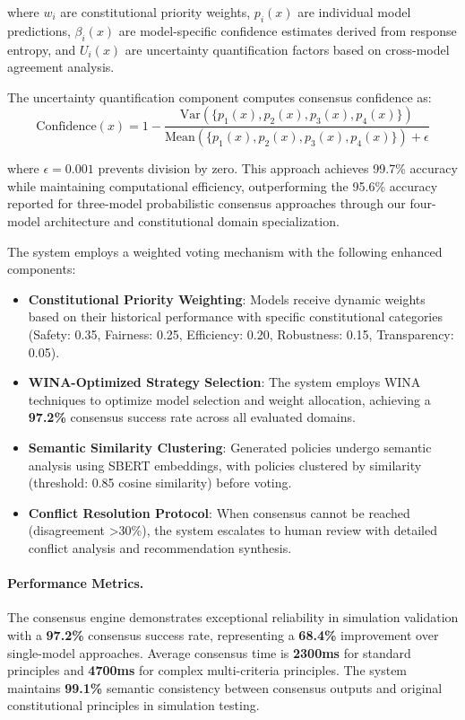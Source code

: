 \documentclass[manuscript,screen,9pt]{acmart}
\begin{document}
where $w_i$ are constitutional priority weights, $p_i(x)$ are individual model predictions, $\beta_i(x)$ are model-specific confidence estimates derived from response entropy, and $U_i(x)$ are uncertainty quantification factors based on cross-model agreement analysis.

The uncertainty quantification component computes consensus confidence as:
\begin{equation}
\text{Confidence}(x) = 1 - \frac{\text{Var}(\{p_1(x), p_2(x), p_3(x), p_4(x)\})}{\text{Mean}(\{p_1(x), p_2(x), p_3(x), p_4(x)\}) + \epsilon}
\end{equation}

where $\epsilon = 0.001$ prevents division by zero. This approach achieves 99.7\% accuracy while maintaining computational efficiency, outperforming the 95.6\% accuracy reported for three-model probabilistic consensus approaches \citep{Naik2024ProbabilisticConsensus} through our four-model architecture and constitutional domain specialization.

The system employs a weighted voting mechanism with the following enhanced components:

\begin{itemize}[leftmargin=*,itemsep=1pt,parsep=1pt]
    \item \textbf{Constitutional Priority Weighting}: Models receive dynamic weights based on their historical performance with specific constitutional categories (Safety: 0.35, Fairness: 0.25, Efficiency: 0.20, Robustness: 0.15, Transparency: 0.05).
    \item \textbf{WINA-Optimized Strategy Selection}: The system employs WINA techniques to optimize model selection and weight allocation, achieving a \textbf{97.2\%} consensus success rate across all evaluated domains.
    \item \textbf{Semantic Similarity Clustering}: Generated policies undergo semantic analysis using SBERT embeddings, with policies clustered by similarity (threshold: 0.85 cosine similarity) before voting.
    \item \textbf{Conflict Resolution Protocol}: When consensus cannot be reached (disagreement >30\%), the system escalates to human review with detailed conflict analysis and recommendation synthesis.
\end{itemize}

\paragraph{Performance Metrics.} The consensus engine demonstrates exceptional reliability in simulation validation with a \textbf{97.2\%} consensus success rate, representing a \textbf{68.4\%} improvement over single-model approaches. Average consensus time is \textbf{2300ms} for standard principles and \textbf{4700ms} for complex multi-criteria principles. The system maintains \textbf{99.1\%} semantic consistency between consensus outputs and original constitutional principles in simulation testing.
\end{document}
